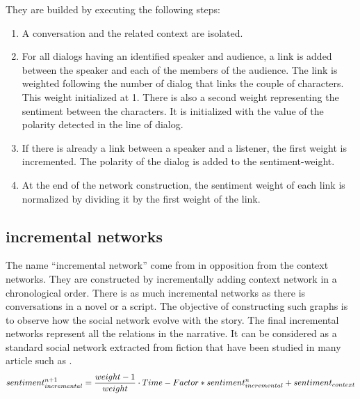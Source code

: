 \documentclass[a4paper, 12pt]{report}
\begin{document}
They are builded by executing the following steps:
\begin{enumerate}
\item A conversation and the related context are isolated.
\item For all dialogs having an identified speaker and audience, a link is added between the speaker and each of the members of the audience. The link is weighted following the number of dialog that links the couple of characters. This weight initialized at 1. There is also a second weight representing the sentiment between the characters. It is initialized with the value of the polarity detected in the line of dialog.
\item If there is already a link between a speaker and a listener, the first weight is incremented.  The polarity of the dialog is added to the sentiment-weight.
\item At the end of the network construction, the sentiment weight of each link is normalized by dividing it by the first weight of the link.
\end{enumerate}

\subsection{incremental networks}
The name ``incremental network'' come from \cite{original} in opposition from the context networks. They are constructed by incrementally adding context network in a chronological order. There is as much incremental networks as there is conversations in a novel or a script. The objective of constructing such graphs is to observe how the social network evolve with the story.
The final incremental networks represent all the relations in the narrative. It can be considered as a standard social network extracted from fiction that have been studied in many article such as \cite{agarwal-etal-2013-automatic, NER, character_country, movie, fiction, Dekker2018EvaluatingSN}.\\

\begin{equation}
sentiment_{incremental}^{n+1} = \frac{weight - 1}{weight} \cdot Time-Factor * sentiment_{incremental}^{n} + sentiment_{context}\\
\label{sentiment}
\end{equation}
\end{document}
